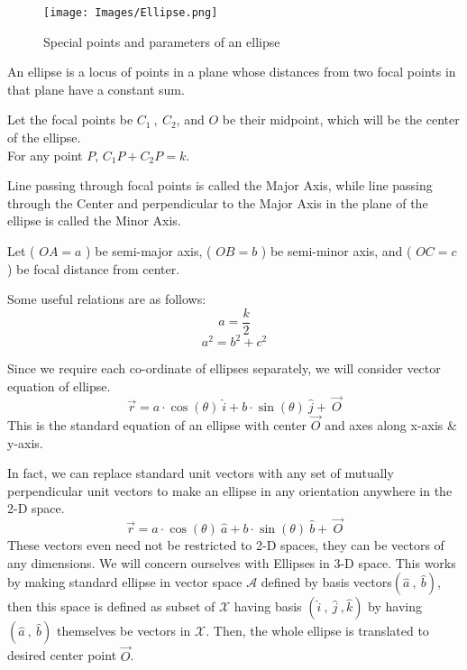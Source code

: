\documentclass[a4paper]{article}
\begin{document}
\begin{figure}[h]
    \centering
    \texttt{[image: Images/Ellipse.png]}
    \caption{Special points and parameters of an ellipse}
    \label{fig:enter-label}
\end{figure}
An ellipse is a locus of points in a plane whose distances from two focal points in that plane have a constant sum.

Let the focal points be \(C_{1}\ ,\ C_{2}\), and \(O\) be their midpoint, which will be the center of the ellipse.\\ For any point \(P\), \(C_{1}P + C_{2}P = k\).

Line passing through focal points is called the Major Axis, while line passing through the Center and perpendicular to the Major Axis in the plane of the ellipse is called the Minor Axis.

Let ( \(OA = a\) ) be semi-major axis, ( \(OB = b\) ) be semi-minor axis, and ( \(OC = c\) ) be focal distance from center.

Some useful relations are as follows:
\[a = \frac{k}{2}\]
\[a^{2} = b^{2} + c^{2}\]

Since we require each co-ordinate of ellipses separately, we will consider vector equation of ellipse.
\[\vec{r} = a \cdot \cos(\theta)\ \hat{i} + b \cdot \sin(\theta)\ \hat{j} + \ \Vec{O}\]
This is the standard equation of an ellipse with center \(\vec{O}\) and axes along x-axis \& y-axis.

In fact, we can replace standard unit vectors with any set of mutually perpendicular unit vectors to make an ellipse in any orientation anywhere in the 2-D space.
\[\vec{r} = a \cdot \cos(\theta)\ \hat{a} + b \cdot \sin(\theta)\ \hat{b} + \ \Vec{O}\]
These vectors even need not be restricted to 2-D spaces, they can be vectors of any dimensions. We will concern ourselves with Ellipses in 3-D space. This works by making standard ellipse in vector space \(\mathcal{A}\) defined by basis vectors\((\hat{a}\ ,\ \hat{b} )\), then this space is defined as subset of \(\mathcal{X}\) having basis \((\hat{i}\ ,\ \hat{j}\ , \hat{k} )\) by having \((\hat{a}\ ,\ \hat{b} )\) themselves be vectors in \(\mathcal{X}\). Then, the whole ellipse is translated to desired center point \(\vec{O}\). 
\end{document}
